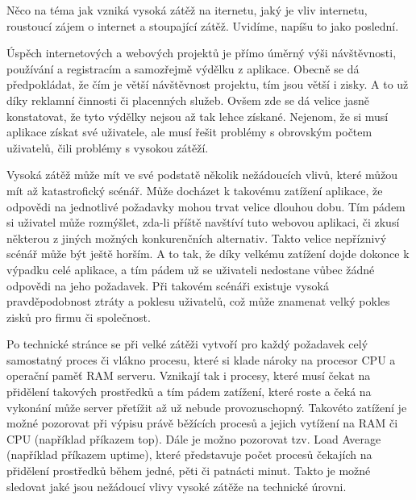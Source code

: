 \documentclass[12pt]{article}
\begin{document}
\pagestyle{headings}



\obsah
{}



Něco na téma jak vzniká vysoká zátěž na iternetu, jaký je vliv internetu, roustoucí zájem o internet a stoupající zátěž. Uvidíme, napíšu to jako poslední.


Úspěch internetových a webových projektů je přímo úměrný výši návštěvnosti, používání a registracím a samozřejmě výdělku z aplikace. Obecně se dá předpokládat, že čím je větší návštěvnost projektu, tím jsou větší i zisky. A to už díky reklamní činnosti či placenných služeb. Ovšem zde se dá velice jasně konstatovat, že tyto výdělky nejsou až tak lehce získané. Nejenom, že si musí aplikace získat své uživatele, ale musí řešit problémy s obrovským počtem uživatelů, čili problémy s vysokou zátěží.

Vysoká zátěž může mít ve své podstatě několik nežádoucích vlivů, které můžou mít až katastrofický scénář. Může docházet k takovému zatížení aplikace, že odpovědi na jednotlivé požadavky mohou trvat velice dlouhou dobu. Tím pádem si uživatel může rozmýšlet, zda-li příště navštíví tuto webovou aplikaci, či zkusí některou z jiných možných konkurenčních alternativ. Takto velice nepříznivý scénář může být ještě horším. A to tak, že díky velkému zatížení dojde dokonce k výpadku celé aplikace, a tím pádem už se uživateli nedostane vůbec žádné odpovědi na jeho požadavek. Při takovém scénáři existuje vysoká pravděpodobnost ztráty a poklesu uživatelů, což může znamenat velký pokles zisků pro firmu či společnost.

Po technické stránce se při velké zátěži vytvoří pro každý požadavek celý samostatný proces či vlákno procesu, které si klade nároky na procesor CPU a operační paměť RAM serveru. Vznikají tak i procesy, které musí čekat na přidělení takových prostředků a tím pádem zatížení, které roste a čeká na vykonání může server přetížit až už nebude provozuschopný. Takovéto zatížení je možné pozorovat při výpisu právě běžících procesů a jejich vytížení na RAM či CPU (například příkazem top). Dále je možno pozorovat tzv. Load Average (například příkazem uptime), které představuje počet procesů čekajích na přidělení prostředků během jedné, pěti či patnácti minut. Takto je možné sledovat jaké jsou nežádoucí vlivy vysoké zátěže na technické úrovni.\cite{sledovani-zatizeni}
\end{document}

